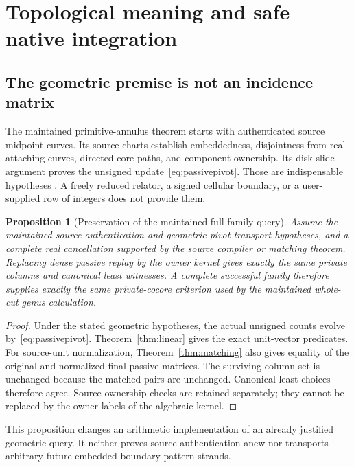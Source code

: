 \documentclass[11pt,letterpaper]{article}
\newtheorem{proposition}[theorem]{Proposition}
\theoremstyle{definition}
\begin{document}
\section{Topological meaning and safe native integration}
\subsection{The geometric premise is not an incidence matrix}
The maintained primitive-annulus theorem starts with authenticated source midpoint curves. Its source charts establish embeddedness, disjointness from real attaching curves, directed core paths, and component ownership. Its disk-slide argument proves the unsigned update~\eqref{eq:passivepivot}. Those are indispensable hypotheses \cite{repoAnnuli}. A freely reduced relator, a signed cellular boundary, or a user-supplied row of integers does not provide them.

\begin{proposition}[Preservation of the maintained full-family query]\label{prop:native}
Assume the maintained source-authentication and geometric pivot-transport hypotheses, and a complete real cancellation supported by the source compiler or matching theorem. Replacing dense passive replay by the owner kernel gives exactly the same private columns and canonical least witnesses. A complete successful family therefore supplies exactly the same private-cocore criterion used by the maintained whole-cut genus calculation.
\end{proposition}
\begin{proof}
Under the stated geometric hypotheses, the actual unsigned counts evolve by~\eqref{eq:passivepivot}. Theorem~\ref{thm:linear} gives the exact unit-vector predicates. For source-unit normalization, Theorem~\ref{thm:matching} also gives equality of the original and normalized final passive matrices. The surviving column set is unchanged because the matched pairs are unchanged. Canonical least choices therefore agree. Source ownership checks are retained separately; they cannot be replaced by the owner labels of the algebraic kernel.
\end{proof}

This proposition changes an arithmetic implementation of an already justified geometric query. It neither proves source authentication anew nor transports arbitrary future embedded boundary-pattern strands.
\end{document}
